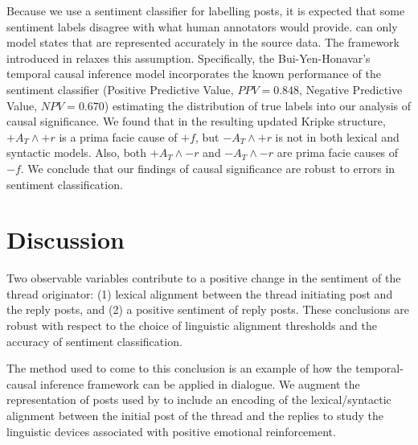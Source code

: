 Because we use a sentiment classifier \parencite{qiu2011get} for labelling posts, it is expected that some sentiment labels disagree with what human annotators would provide.   can only model states that are represented accurately in the source data. The framework introduced in \textcite{bui2016temporal} relaxes this assumption. Specifically, the Bui-Yen-Honavar's temporal causal inference model incorporates the known performance  of the sentiment classifier (Positive Predictive Value, $PPV=0.848$, Negative Predictive Value, $NPV=0.670$) estimating the distribution of true labels into our analysis of causal significance.
We found that in the resulting updated Kripke structure, $+A_T \wedge +r$ is a prima facie cause of $+f$, but $-A_T \wedge +r$ is not in both lexical and syntactic models. Also, both $+A_T \wedge -r$ and $-A_T \wedge -r$ are prima facie causes of $-f$. We conclude that our findings of causal significance are robust to errors in sentiment classification.

\section{Discussion}







Two observable variables contribute to  a  positive  change  in  the  sentiment  of  the thread originator: (1) lexical  alignment  between the thread initiating post and the reply posts, and (2) a positive sentiment  of  reply  posts.  These conclusions are robust with respect to the choice of linguistic alignment thresholds and the accuracy of sentiment classification.

The method used to come to this conclusion is  an example of how the temporal-causal inference framework \parencite{bui2016temporal} can be applied in dialogue.
 We augment the representation of posts used by \textcite{bui2016temporal} to include an encoding of the lexical/syntactic alignment between the initial post of the thread and the replies to study the linguistic devices associated with positive emotional reinforcement.

